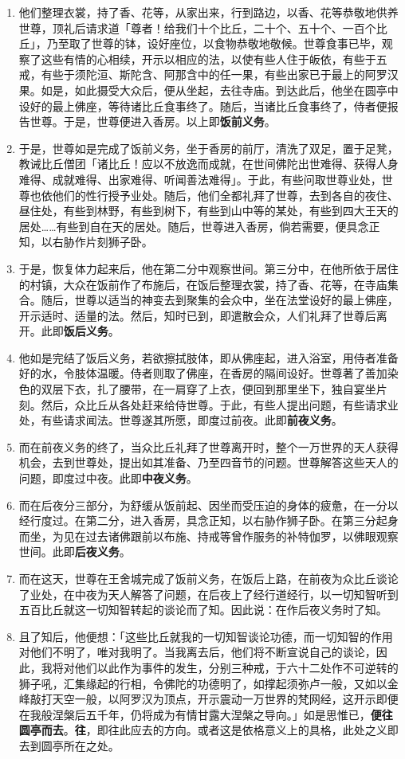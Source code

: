 \begin{enumerate}
\item 他们整理衣裳，持了香、花等，从家出来，行到路边，以香、花等恭敬地供养世尊，顶礼后请求道「尊者！给我们十个比丘，二十个、五十个、一百个比丘」，乃至取了世尊的钵，设好座位，以食物恭敬地敬候。世尊食事已毕，观察了这些有情的心相续，开示以相应的法，以使有些人住于皈依，有些于五戒，有些于须陀洹、斯陀含、阿那含中的任一果，有些出家已于最上的阿罗汉果。如是，如此摄受大众后，便从坐起，去往寺庙。到达此后，他坐在圆亭中设好的最上佛座，等待诸比丘食事终了。随后，当诸比丘食事终了，侍者便报告世尊。于是，世尊便进入香房。以上即\textbf{饭前义务}。
\item 于是，世尊如是完成了饭前义务，坐于香房的前厅，清洗了双足，置于足凳，教诫比丘僧团「诸比丘！应以不放逸而成就，在世间佛陀出世难得、获得人身难得、成就难得、出家难得、听闻善法难得」。于此，有些问取世尊业处，世尊也依他们的性行授予业处。随后，他们全都礼拜了世尊，去到各自的夜住、昼住处，有些到林野，有些到树下，有些到山中等的某处，有些到四大王天的居处……有些到自在天的居处。随后，世尊进入香房，倘若需要，便具念正知，以右胁作片刻狮子卧。
\item 于是，恢复体力起来后，他在第二分中观察世间。第三分中，在他所依于居住的村镇，大众在饭前作了布施后，在饭后整理衣裳，持了香、花等，在寺庙集合。随后，世尊以适当的神变去到聚集的会众中，坐在法堂设好的最上佛座，开示适时、适量的法。然后，知时已到，即遣散会众，人们礼拜了世尊后离开。此即\textbf{饭后义务}。
\item 他如是完结了饭后义务，若欲擦拭肢体，即从佛座起，进入浴室，用侍者准备好的水，令肢体温暖。侍者则取了佛座，在香房的隔间设好。世尊著了善加染色的双层下衣，扎了腰带，在一肩穿了上衣，便回到那里坐下，独自宴坐片刻。然后，众比丘从各处赶来给侍世尊。于此，有些人提出问题，有些请求业处，有些请求闻法。世尊遂其所愿，即度过前夜。此即\textbf{前夜义务}。
\item 而在前夜义务的终了，当众比丘礼拜了世尊离开时，整个一万世界的天人获得机会，去到世尊处，提出如其准备、乃至四音节的问题。世尊解答这些天人的问题，即度过中夜。此即\textbf{中夜义务}。
\item 而在后夜分三部分，为舒缓从饭前起、因坐而受压迫的身体的疲惫，在一分以经行度过。在第二分，进入香房，具念正知，以右胁作狮子卧。在第三分起身而坐，为见在过去诸佛跟前以布施、持戒等曾作服务的补特伽罗，以佛眼观察世间。此即\textbf{后夜义务}。
\item 而在这天，世尊在王舍城完成了饭前义务，在饭后上路，在前夜为众比丘谈论了业处，在中夜为天人解答了问题，在后夜上了经行道经行，以一切知智听到五百比丘就这一切知智转起的谈论而了知。因此说：在作后夜义务时了知。
\item 且了知后，他便想：「这些比丘就我的一切知智谈论功德，而一切知智的作用对他们不明了，唯对我明了。当我离去后，他们将不断宣说自己的谈论，因此，我将对他们以此作为事件的发生，分别三种戒，于六十二处作不可逆转的狮子吼，汇集缘起的行相，令佛陀的功德明了，如撑起须弥卢一般，又如以金峰敲打天空一般，以阿罗汉为顶点，开示震动一万世界的梵网经，这开示即便在我般涅槃后五千年，仍将成为有情甘露大涅槃之导向。」如是思惟已，\textbf{便往圆亭而去}。\textbf{往}，即往此应去的方向。或者这是依格意义上的具格，此处之义即去到圆亭所在之处。

\end{enumerate}
